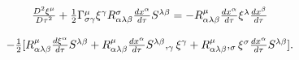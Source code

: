 \begin{equation}
\begin{array}{c}
\frac{D^{2}\xi^{\mu}}{D\tau^{2}}+\frac{1}{2}\Gamma_{\sigma\gamma}^{\mu}\xi^{%
\gamma}R_{\alpha\lambda\beta}^{\sigma}\frac{dx^{\alpha}}{d\tau}%
S^{\lambda\beta}=-R_{\alpha\lambda\beta}^{\mu}\frac{dx^{\alpha}}{d\tau}%
\xi^{\lambda}\frac{dx^{\beta}}{d\tau} \\ 
\\ 
-\frac{1}{2}[R_{\alpha\lambda\beta}^{\mu}\frac{d\xi^{\alpha}}{d\tau}%
S^{\lambda\beta}+R_{\alpha\lambda\beta}^{\mu}\frac{dx^{\alpha}}{d\tau }%
S^{\lambda\beta},_{\gamma}\xi^{\gamma}+R_{\alpha\lambda\beta}^{\mu},_{\sigma
}\xi^{\sigma}\frac{dx^{\alpha}}{d\tau}S^{\lambda\beta}].
\end{array}
\label{26}
\end{equation}

